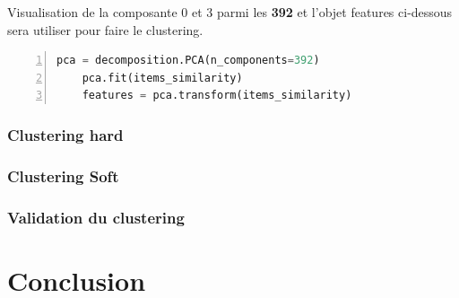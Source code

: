 Visualisation de la composante 0 et 3 parmi les \textbf{392} et l’objet \colorbox{gray!30}{features} ci-dessous sera utiliser pour faire le clustering.
\begin{lstlisting}[language=Python,label={pca_code}, basicstyle=\scriptsize, frame=l,framesep=4.5mm,framexleftmargin=2.5mm,tabsize=2,numbers=left,fillcolor=\color{blueforest!70},rulecolor=\color{blueforest},numberstyle=\normalfont\tiny\color{white}]
	pca = decomposition.PCA(n_components=392)
	pca.fit(items_similarity)
	features = pca.transform(items_similarity)
\end{lstlisting}

\subsubsection{Clustering hard}


\subsubsection{Clustering Soft}


\subsubsection{Validation du clustering}



\section{Conclusion}

